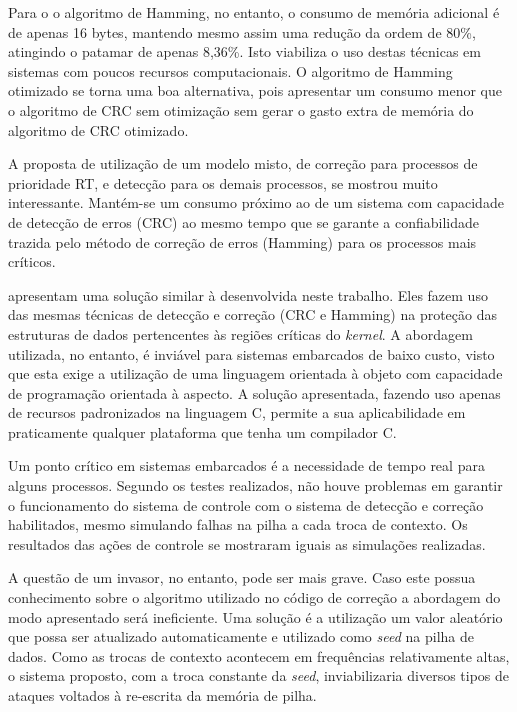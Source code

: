 \documentclass[12pt,openright,oneside,a4paper,brazil]{abntex2}
\begin{document}
Para o o algoritmo de Hamming, no entanto, o consumo de memória adicional é de apenas 16 bytes, mantendo mesmo assim uma redução da ordem de 80\%, atingindo o patamar de apenas 8,36\%. Isto viabiliza o uso destas técnicas em sistemas com poucos recursos computacionais. O algoritmo de Hamming otimizado se torna uma boa alternativa, pois apresentar um consumo menor que o algoritmo de CRC sem otimização sem gerar o gasto extra de memória do algoritmo de CRC otimizado.

A proposta de utilização de um modelo misto, de correção para processos de prioridade RT, e detecção para os demais processos, se mostrou muito interessante. Mantém-se um consumo próximo ao de um sistema com capacidade de detecção de erros (CRC) ao mesmo tempo que se garante a confiabilidade trazida pelo método de correção de erros (Hamming) para os processos mais críticos.

 apresentam uma solução similar à desenvolvida neste trabalho. Eles fazem uso das mesmas técnicas de detecção e correção (CRC e Hamming) na proteção das estruturas de dados pertencentes às regiões críticas do \textit{kernel}. A abordagem utilizada, no entanto, é inviável para sistemas embarcados de baixo custo, visto que esta exige a utilização de uma linguagem orientada à objeto com capacidade de programação orientada à aspecto. A solução apresentada, fazendo uso apenas de recursos padronizados na linguagem C, permite a sua aplicabilidade em praticamente qualquer plataforma que tenha um compilador C.

Um ponto crítico em sistemas embarcados é a necessidade de tempo real para alguns processos. Segundo os testes realizados, não houve problemas em garantir o funcionamento do sistema de controle com o sistema de detecção e correção habilitados, mesmo simulando falhas na pilha a cada troca de contexto. Os resultados das ações de controle se mostraram iguais as simulações realizadas.

A questão de um invasor, no entanto, pode ser mais grave. Caso este possua conhecimento sobre o algoritmo utilizado no código de correção a abordagem do modo apresentado será ineficiente. Uma solução é a utilização um valor aleatório que possa ser atualizado automaticamente e utilizado como \textit{seed} na pilha de dados. Como as trocas de contexto acontecem em frequências relativamente altas, o sistema proposto, com a troca constante da \textit{seed}, inviabilizaria diversos tipos de ataques voltados à re-escrita da memória de pilha. 
\end{document}
